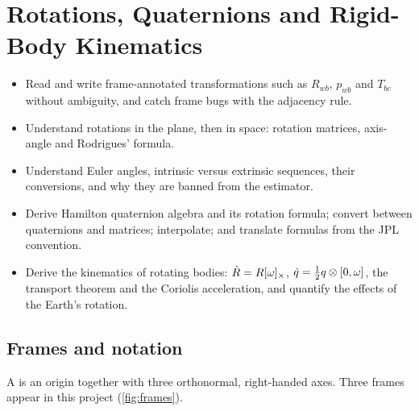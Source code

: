 \chapter{Rotations, Quaternions and Rigid-Body Kinematics}
\label{ch:rotations}

\begin{objectives}
\begin{itemize}
  \item Read and write frame-annotated transformations such as $R_{wb}$, $p_{wb}$ and $T_{bc}$ without ambiguity, and catch frame bugs
        with the adjacency rule.
  \item Understand rotations in the plane, then in space: rotation matrices, axis-angle and Rodrigues' formula.
  \item Understand Euler angles, intrinsic versus extrinsic sequences, their conversions, and why they are banned from the estimator.
  \item Derive Hamilton quaternion algebra and its rotation formula; convert between quaternions and matrices; interpolate; and
        translate formulas from the JPL convention.
  \item Derive the kinematics of rotating bodies: $\dot R = R[\omega]_{\times}$, $\dot q = \tfrac12 q\otimes[0,\omega]$, the transport theorem and the Coriolis
        acceleration, and quantify the effects of the Earth's rotation.
\end{itemize}
\end{objectives}

\section{Frames and notation}

A  is an origin together with three orthonormal, right-handed axes. Three frames appear in this project (\cref{fig:frames}).

